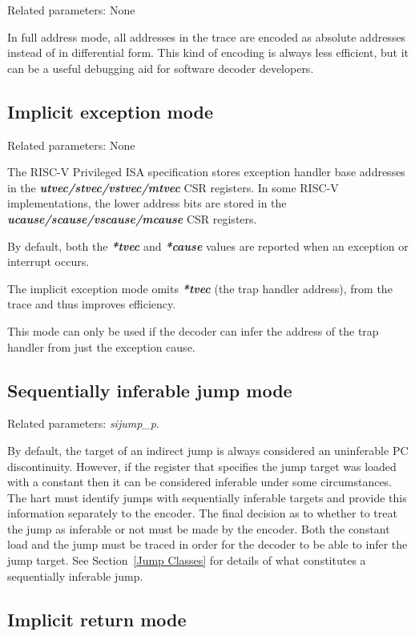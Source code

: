 Related parameters: None

In full address mode, all addresses in the trace are encoded as absolute addresses instead
of in differential form. This kind of encoding is always less efficient, but it can be a useful 
debugging aid for software decoder developers.

\subsection{Implicit exception mode} \label{sec:implicit-exception}

Related parameters: None

The RISC-V Privileged ISA specification stores exception handler base
addresses in the \textbf{\textit{utvec/stvec/vstvec/mtvec}} CSR registers.
In some RISC-V implementations, the lower address bits are stored in
the \textbf{\textit{ucause/scause/vscause/mcause}} CSR registers.

By default, both the \textbf{\textit{*tvec}} and \textbf{\textit{*cause}} 
values are reported when an exception or interrupt occurs.

The implicit exception mode omits \textbf{\textit{*tvec}} (the trap handler address), 
from the trace and thus improves efficiency.

This mode can only be used if the decoder can infer the address of the trap handler
from just the exception cause.

\subsection{Sequentially inferable jump mode} \label{sec:si-jump}

Related parameters: \textit{sijump\_p}.

By default, the target of an indirect jump is always considered an uninferable PC discontinuity.  
However, if the register that specifies the jump target was loaded with a constant then it
can be considered inferable under some circumstances.  The hart must identify jumps with 
sequentially inferable targets and provide this information separately to the encoder.  The
final decision as to whether to treat the jump as inferable or not must be made by the encoder.
Both the constant load and the jump must be traced in order for the decoder to be able to
infer the jump target.  See Section~\ref{Jump Classes} for details of what constitutes a sequentially
inferable jump.

\subsection{Implicit return mode} \label{sec:implicit-return}

